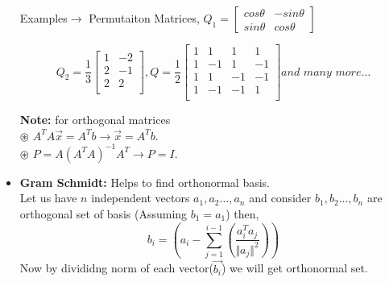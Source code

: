 \documentclass[a4paper,11pt]{article}
\numberwithin{equation}{section}
\begin{document}
\begin{itemize}
Examples$\rightarrow$ Permutaiton Matrices, $Q_1=\begin{bmatrix}
    cos\theta&-sin\theta\\sin\theta&cos\theta
\end{bmatrix}$
\begin{center}
    \[
    Q_2=\frac{1}{3}
    \begin{bmatrix}
        1&-2\\2&-1\\2&2\\
    \end{bmatrix},
    Q=\frac{1}{2}
    \begin{bmatrix}
        1&1&1&1\\1&-1&1&-1\\1&1&-1&-1\\1&-1&-1&1\\
    \end{bmatrix} and\hspace{4pt} many\hspace{4pt} more\dots
    \]
\end{center}
\textbf{Note: }for orthogonal matrices\\
$\circledast$ $A^TA\vec{x}=A^Tb \rightarrow \vec{x}=A^Tb$.\\
$\circledast$ $P=A(A^TA)^{-1}A^T\rightarrow P=I$.\\

\item \textbf{Gram Schmidt: }Helps to find orthonormal basis.\\
Let us have $n$ independent vectors $a_1,a_2\dots,a_n$ and consider $b_1,b_2\dots,b_n$ are orthogonal set of basis (Assuming $b_1=a_1$) then,
    \begin{equation}
        b_i=\left(a_i-\sum_{j=1}^{i-1} \left(\frac{a_i^Ta_j}{\Vert a_j\Vert^2}\right)\right)
    \end{equation}
Now by divididng norm of each vector($\vec{b_i}$) we will get orthonormal set.


\end{itemize}
\end{document}
